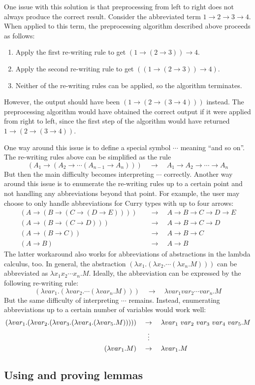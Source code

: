 One issue with this solution is that preprocessing from left to right does not always produce the correct result. Consider the abbreviated term $1 \to 2 \to 3 \to 4$. When applied to this term, the preprocessing algorithm described above proceeds as follows:
\begin{enumerate}
    \item Apply the first re-writing rule to get $(1 \to (2 \to 3)) \to 4$.
    \item Apply the second re-writing rule to get $((1 \to (2 \to 3)) \to 4)$.
    \item Neither of the re-writing rules can be applied, so the algorithm terminates.
\end{enumerate}
However, the output should have been $(1 \to (2 \to (3 \to 4)))$ instead. The preprocessing algorithm would have obtained the correct output if it were applied from right to left, since the first step of the algorithm would have returned $1 \to (2 \to (3 \to 4))$.

One way around this issue is to define a special symbol $\cdots$ meaning ``and so on''. The re-writing rules above can be simplified as the rule
\[
    (A_1 \to (A_2 \to \cdots (A_{n-1} \to A_n))) \quad \to \quad A_1 \to A_2 \to \cdots \to A_n
\]
But then the main difficulty becomes interpreting $\cdots$ correctly. Another way around this issue is to enumerate the re-writing rules up to a certain point and not handling any abbreviations beyond that point. For example, the user may choose to only handle abbreviations for Curry types with up to four arrows:
\begin{align*}
    (A \to (B \to (C \to (D \to E)))) \quad &\to \quad A \to B \to C \to D \to E \\
    (A \to (B \to (C \to D))) \quad &\to \quad A \to B \to C \to D \\
    (A \to (B \to C)) \quad &\to \quad A \to B \to C \\
    (A \to B) \quad &\to \quad A \to B
\end{align*}
The latter workaround also works for abbreviations of abstractions in the lambda calculus, too. In general, the abstraction $(\lambda x_1. (\lambda x_2. \cdots (\lambda x_n. M)))$ can be abbreviated as $\lambda x_1 x_2 \cdots x_n. M$. Ideally, the abbreviation can be expressed by the following re-writing rule:
\[
     (\lambda var_1. (\lambda var_2. \cdots (\lambda var_n. M))) \quad \to \quad \lambda var_1 var_2 \cdots var_n. M
\]
But the same difficulty of interpreting $\cdots$ remains. Instead, enumerating abbreviations up to a certain number of variables would work well:
\begin{align*}
    (\lambda var_1. (\lambda var_2. (\lambda var_3. (\lambda var_4. (\lambda var_5. M))))) \quad &\to \quad \lambda var_1\ var_2\ var_3\ var_4\ var_5. M \\
    &\vdotswithin{\to} \\
    (\lambda var_1. M) \quad &\to \quad \lambda var_1. M
\end{align*}

\subsection{Using and proving lemmas}
